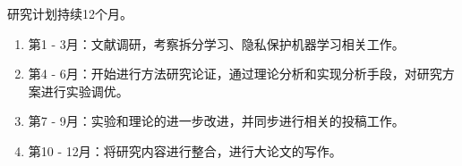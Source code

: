 研究计划持续12个月。
\begin{enumerate}
    \item 第1 - 3月：文献调研，考察拆分学习、隐私保护机器学习相关工作。
    \item 第4 - 6月：开始进行方法研究论证，通过理论分析和实现分析手段，对研究方案进行实验调优。
    \item 第7 - 9月：实验和理论的进一步改进，并同步进行相关的投稿工作。
    \item 第10 - 12月：将研究内容进行整合，进行大论文的写作。
\end{enumerate}